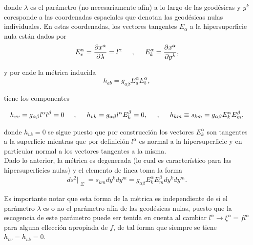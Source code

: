 \documentclass{article}
\numberwithin{equation}{section}
\theoremstyle{definition}
\begin{document}
donde $\lambda$ es el parámetro (no necesariamente afín) a lo largo de las geodésicas y $y^k$ coresponde a las coordenadas espaciales que denotan las geodésicas nulas individuales. En estas coordenadas, los vectores tangentes $E_\alpha$ a la hipersuperficie nula están dados por
\begin{equation*}
E^{\alpha}_{v} = \frac{\partial x^\alpha}{\partial \lambda} = l^\alpha \hspace{.5cm}, \hspace{.5cm} E^{\alpha}_{k} =\frac{\partial x^\alpha}{\partial y^k},
\end{equation*}

y por ende la métrica inducida
\begin{equation*}
h_{ab} = g_{\alpha \beta} E^{\alpha}_{a} E^{\alpha}_{b},
\end{equation*}

tiene los componentes 

\begin{equation*}
h_{vv} = g_{\alpha \beta} l^\alpha l^\beta = 0 \hspace{.5cm},\hspace{.5cm} h_{vk} = g_{\alpha \beta} l^\alpha E^{\beta}_{k} = 0, \hspace{.5cm},\hspace{.5cm} h_{km} \equiv s_{km} = g_{\alpha \beta} E^{\alpha}_{k} E^{\beta}_{m},
\end{equation*}

donde $h_{vk} = 0$ se sigue puesto que por construcción los vectores $E^{\alpha}_{k}$ son tangentes a la superficie mientras que por definición $l^\alpha$ es normal a la hipersuperficie y en particular normal a los vectores tangentes a la misma. \\

Dado lo anterior, la métrica es degenerada (lo cual es característico para las hipersuperficies nulas) y el elemento de línea toma la forma
\begin{equation*}
ds^2|_{\substack{\Sigma}} = s_{km}dy^k dy^m = g_{\alpha \beta} E^{\alpha}_{k} E^{\beta}_{m} dy^k dy^m.
\end{equation*}

Es importante notar que esta forma de la métrica es independiente de si el parámetro $\lambda$ es o no el parámetro afín de las geodésicas nulas, puesto que la escogencia de este parámetro puede ser tenida en cuenta al cambiar $l^\alpha \to \xi^\alpha = fl^\alpha$ para alguna ellección apropiada de $f$, de tal forma que siempre se tiene $h_{vv} = h_{vk} = 0$.
\end{document}
